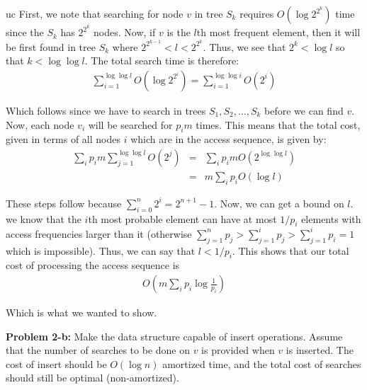 \documentclass[psamsfonts]{amsart}
\newenvironment{sol}{\vspace{0.25cm}{\large \bfseries Solution:}}{\qedsymbol}
\newenvironment{prob}[1]{\begin{framed}{\large \bfseries Problem #1:}}{\end{framed}}
\begin{document}
uc\begin{sol}
First, we note that searching for node $v$ in tree $S_k$ requires $O(\log 2^{2^k})$ time since the $S_k$ has $2^{2^k}$ nodes. Now, if $v$ is the $l$th most frequent element, then it will be first found in tree $S_k$ where $2^{2^{k-1}} < l < 2^{2^{k}}$. Thus, we see that $2^k < \log l$ so that $k < \log \log l$. The total search time is therefore:
\begin{eqnarray}
\sum_{i=1}^{\log \log l} O(\log 2^{2^i}) = \sum_{i=1}^{\log \log i} O(2^i)
\end{eqnarray}

Which follows since we have to search in trees $S_1, S_2, \ldots, S_k$ before we can find $v$. Now, each node $v_i$ will be searched for $p_i m$ times. This means that the total cost, given in terms of all nodes $i$ which are in the access sequence, is given by:
\begin{eqnarray}
\sum_{i} p_i m \sum_{j=1}^{\log \log l} O(2^j) &=& \sum_{i} p_i m O(2^{\log \log l}) \\
&=& m \sum_{i} p_i O(\log l) 
\end{eqnarray}

These steps follow because $\sum_{i=0}^n 2^i = 2^{n+1} - 1$. Now, we can get a bound on $l$. we know that the $i$th most probable element can have at most $1/p_i$ elements with access frequencies larger than it (otherwise $\sum_{j=1}^n p_j > \sum_{j=1}^i p_j > \sum_{j=1}^i p_i = 1$ which is impossible). Thus, we can say that $l < 1/p_i$. This shows that our total cost of processing the access sequence is 
\begin{eqnarray}
O \left( m \sum_{i} p_i \log \frac{1}{p_i} \right)
\end{eqnarray}

Which is what we wanted to show.
\end{sol}

\begin{prob}{2-b}
Make the data structure capable of insert operations. Assume that the number of searches to be done on $v$ is provided when $v$ is inserted. The cost of insert should be $O(\log n)$ amortized time, and the total cost of searches should still be optimal (non-amortized).
\end{prob}
\end{document}
